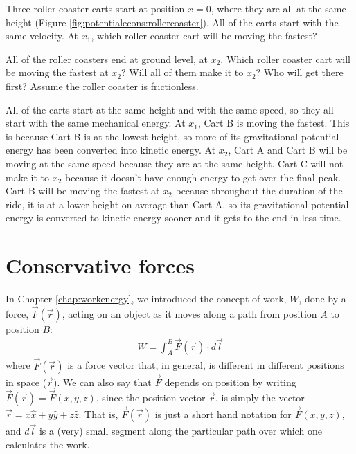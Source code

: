 \begin{opening}
Three roller coaster carts start at position $x=0$,  where they are all at the same height (Figure \ref{fig:potentialecons:rollercoaster}). All of the carts start with the same velocity. At $x_1$, which roller coaster cart will be moving the fastest? 

All of the roller coasters end at ground level, at $x_2$. Which roller coaster cart will be moving the fastest at $x_2$? Will all of them make it to $x_2$? Who will get there first?  Assume the roller coaster is frictionless.
\begin{answer}
All of the carts start at the same height and with the same speed, so they all start with the same mechanical energy. At $x_1$, Cart B is moving the fastest. This is because Cart B is at the lowest height, so more of its gravitational potential energy has been converted into kinetic energy. At $x_2$, Cart A and Cart B will be moving at the same speed because they are at the same height. Cart C will not make it to $x_2$ because it doesn't have enough energy to get over the final peak. Cart B will be moving the fastest at $x_2$ because throughout the duration of the ride, it is at a lower height on average than Cart A, so its gravitational potential energy is converted to kinetic energy sooner and it gets to the end in less time.   
\end{answer}
\end{opening}

\section{Conservative forces}
In Chapter \ref{chap:workenergy}, we introduced the concept of work, $W$, done by a force, $\vec F(\vec r)$, acting on an object as it moves along a path from position $A$ to position $B$:
\begin{align}
\label{eq:potentialecons:workdef}
W = \int_A^B \vec F(\vec r) \cdot d\vec l
\end{align}
where $\vec F(\vec r)$ is a force vector that, in general, is different in different positions in space ($\vec r$). We can also say that $\vec F$ depends on position by writing $\vec F(\vec r)=\vec F(x,y,z)$, since the position vector $\vec r$, is simply the vector $\vec r = x\hat x + y \hat y+ z\hat z$. That is, $\vec F(\vec r)$ is just a short hand notation for $\vec F(x,y,z)$, and $d\vec l$ is a (very) small segment along the particular path over which one calculates the work.

